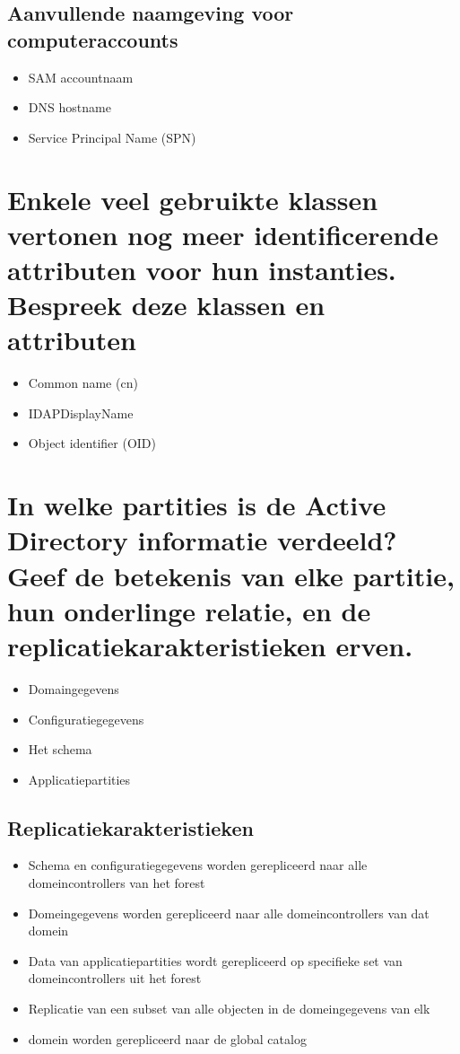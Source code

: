 \subsection{Aanvullende naamgeving voor computeraccounts}

\begin{itemize}
	\item SAM accountnaam
	\item DNS hostname
	\item Service Principal Name (SPN)
\end{itemize}

\section{Enkele veel gebruikte klassen vertonen nog meer identificerende
attributen voor hun instanties. Bespreek deze klassen en attributen}

\begin{itemize}
	\item Common name (cn)
	\item IDAPDisplayName
	\item Object identifier (OID)
\end{itemize}

\section{In welke partities is de Active Directory informatie verdeeld? Geef de
betekenis van elke partitie, hun onderlinge relatie, en de
replicatiekarakteristieken erven.}

\begin{itemize}
	\item Domaingegevens
	\item Configuratiegegevens
	\item Het schema
	\item Applicatiepartities
\end{itemize}

\subsection{Replicatiekarakteristieken}

\begin{itemize}
	\item Schema en configuratiegegevens worden gerepliceerd naar alle
		domeincontrollers van het forest
	\item Domeingegevens worden gerepliceerd naar alle domeincontrollers van
		dat domein
	\item Data van applicatiepartities wordt gerepliceerd op specifieke set
		van domeincontrollers uit het forest
	\item Replicatie van een subset van alle objecten in de domeingegevens van elk
	\item domein worden gerepliceerd naar de global catalog
\end{itemize}
